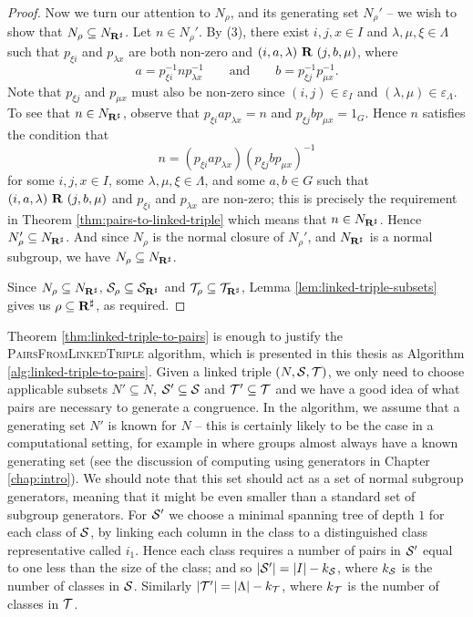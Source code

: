 \begin{theorem}
\begin{proof}
    Now we turn our attention to $N_\rho$, and its generating set $N_\rho'$ -- we
    wish to show that $N_\rho \subseteq N_{\mathbf{R}^\sharp}$.  Let $n \in N_\rho'$.  By (3),
    there exist $i, j, x \in I$ and $\lambda, \mu, \xi \in \Lambda$ such that
    $p_{\xi i}$ and $p_{\lambda x}$ are both non-zero and
    $(i, a, \lambda) ~\mathbf{R}~ (j, b, \mu)$, where
    $$a = p_{\xi i}^{-1} n p_{\lambda x}^{-1} \qquad \text{and} \qquad
    b = p_{\xi j}^{-1} p_{\mu x}^{-1}.$$
    Note that $p_{\xi j}$ and $p_{\mu x}$
    must also be non-zero since $(i, j) \in \varepsilon_I$ and
    $(\lambda, \mu) \in \varepsilon_\Lambda$.  To see that $n \in N_{\mathbf{R}^\sharp}$, observe
    that $p_{\xi i} a p_{\lambda x} = n$ and $p_{\xi j} b p_{\mu x} = 1_G$.
    Hence $n$ satisfies the condition that
    $$n = (p_{\xi i} a p_{\lambda x}) (p_{\xi j} b p_{\mu x})^{-1}$$
    for some $i,j,x \in I$, some $\lambda, \mu, \xi \in \Lambda$, and some
    $a,b \in G$ such that $(i,a,\lambda) ~\mathbf{R}~ (j,b,\mu)$ and $p_{\xi i}$
    and $p_{\lambda x}$ are non-zero; this is precisely the requirement in
    Theorem \ref{thm:pairs-to-linked-triple} which means that $n \in N_{\mathbf{R}^\sharp}$.
    Hence $N_\rho' \subseteq N_{\mathbf{R}^\sharp}$.  And since $N_\rho$ is the normal closure of
    $N_\rho'$, and $N_{\mathbf{R}^\sharp}$ is a normal subgroup, we have $N_\rho \subseteq N_{\mathbf{R}^\sharp}$.

    Since $N_\rho \subseteq N_{\mathbf{R}^\sharp}$, $\mathcal{S}_\rho \subseteq \mathcal{S}_{\mathbf{R}^\sharp}$ and
    $\mathcal{T}_\rho \subseteq \mathcal{T}_{\mathbf{R}^\sharp}$, Lemma \ref{lem:linked-triple-subsets} gives us
    $\rho \subseteq \mathbf{R}^\sharp$, as required.
  \end{proof}
\end{theorem}

Theorem \ref{thm:linked-triple-to-pairs} is enough to justify the
\textsc{PairsFromLinkedTriple} algorithm, which is presented in this
thesis as Algorithm \ref{alg:linked-triple-to-pairs}.  Given a linked triple
$(N, \mathcal{S}, \mathcal{T})$, we only need to choose applicable subsets $N' \subseteq N$,
$\mathcal{S}' \subseteq \mathcal{S}$ and $\mathcal{T}' \subseteq \mathcal{T}$ and we have a
good idea of what pairs are necessary to generate a congruence.  In the
algorithm, we assume that a generating set $N'$ is known for $N$ -- this is
certainly likely to be the case in a computational setting, for example in \GAP{}
\cite{gap} where groups almost always have a known generating set (see the
discussion of computing using generators in Chapter \ref{chap:intro}).  We should
note that this set should act as a set of normal subgroup generators, meaning
that it might be even smaller than a standard set of subgroup generators.  For
$\mathcal{S}'$ we choose a minimal spanning tree of depth $1$ for each class of $\mathcal{S}$, by linking
each column in the class to a distinguished class representative called $i_1$.
Hence each class requires a number of pairs in $\mathcal{S}'$ equal to one less than the
size of the class; and so $|\mathcal{S}'| = |I| - k_{\mathcal{S}}$, where $k_{\mathcal{S}}$ is the number
of classes in $\mathcal{S}$.  Similarly $|\mathcal{T}'| = |\Lambda| - k_{\mathcal{T}}$, where $k_{\mathcal{T}}$ is
the number of classes in $\mathcal{T}$.

